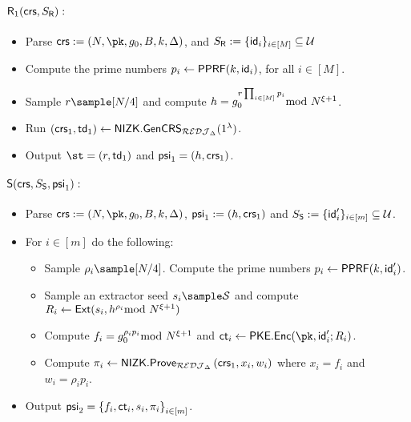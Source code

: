 \begin{construction}
\paragraph{$\mathsf{R}_1(\mathsf{crs},S_{\mathsf{R}}):$}
\begin{itemize}
    \item Parse $\crs := (N,\pk,g_0,B,k,\Delta)$, and $S_{\mathsf{R}} := \{\mathsf{id}_i\}_{i\in [M]}\subseteq \mathcal{U}$
    \item Compute the prime numbers $p_i\leftarrow \mathsf{PPRF}(k,\mathsf{id}_i)$, for all $i\in [M]$.

    \item Sample $r\sample [N/4]$ and compute $h=g_0^{r\prod_{i\in [M]} p_i}\!\!\!\!\mod N^{\xi+1}$.
    \item Run $\left(\mathsf{crs}_1,\mathsf{td}_1\right)\leftarrow\mathsf{NIZK.GenCRS}_{\mathcal{REDJ}_{\Delta}}(1^\lambda)$.
    \item Output $\st=\left(r,\td_1\right)$ and $\mathsf{psi}_1=\left(h,\mathsf{crs}_1\right)$.
\end{itemize}


\paragraph{$\mathsf{S}(\mathsf{crs},S_{\mathsf{S}},\mathsf{psi}_1):$}
\begin{itemize}
    \item Parse $\crs := (N,\pk,g_0,B,k,\Delta)$, $\mathsf{psi}_1 := \left(h,\mathsf{crs}_1\right)$ and $S_{\mathsf{S}} := \{\mathsf{id}'_i\}_{i\in [m]}\subseteq \mathcal{U}$.
\item For $i\in \left[m\right]$ do the following: 
\begin{itemize}

\item Sample $\rho_i\sample [N/4]$. Compute the prime numbers $p_i\leftarrow\mathsf{PPRF}(k,\mathsf{id}'_i)$.
 \item Sample an extractor seed $s_i\sample \Sc$ and compute $R_i\leftarrow\mathsf{Ext}(s_i, h^{\rho_i}\!\!\!\!\mod N^{\xi+1})$

\item Compute $f_i=g_0^{\rho_ip_i}\!\!\!\!\mod N^{\xi+1}$ and $\ct_i\leftarrow\mathsf{PKE.Enc}(\pk,\id'_i;R_i)$.
\item Compute $\pi_i\leftarrow\mathsf{NIZK.Prove}_{\mathcal{REDJ}_\Delta}\left(\mathsf{crs}_1,x_i,w_i\right)$ where $x_i=f_i$ and $w_i=\rho_ip_i$.
\end{itemize}
\item Output $\mathsf{psi}_2=\left\{f_i,\mathsf{ct}_i,s_i,\pi_i\right\}_{i\in [m]}$.
\end{itemize}


\end{construction}
